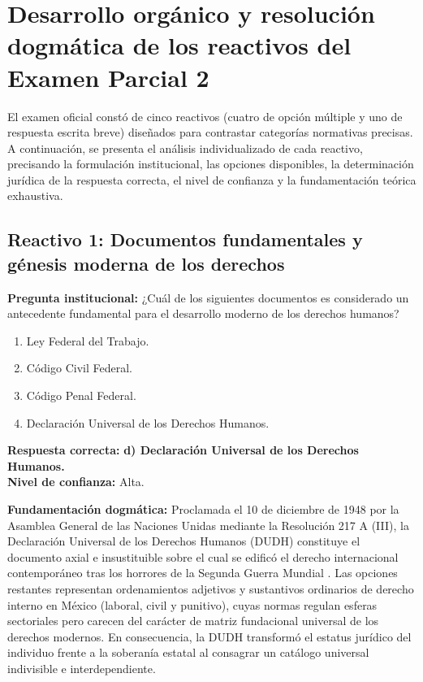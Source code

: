 \documentclass[12pt,spanish,letterpaper,oneside]{article}
\begin{document}
\section[Desarrollo org\'anico]{Desarrollo org\'anico y resoluci\'on dogm\'atica de los reactivos del Examen Parcial 2}

El examen oficial const\'o de cinco reactivos (cuatro de opci\'on m\'ultiple y uno de respuesta escrita breve) dise\~nados para contrastar categor\'ias normativas precisas. A continuaci\'on, se presenta el an\'alisis individualizado de cada reactivo, precisando la formulaci\'on institucional, las opciones disponibles, la determinaci\'on jur\'idica de la respuesta correcta, el nivel de confianza y la fundamentaci\'on te\'orica exhaustiva.

\subsection{Reactivo 1: Documentos fundamentales y g\'enesis moderna de los derechos}
\textbf{Pregunta institucional:} ¿Cu\'al de los siguientes documentos es considerado un antecedente fundamental para el desarrollo moderno de los derechos humanos?
\begin{enumerate}
\item[a)] Ley Federal del Trabajo.
\item[b)] C\'odigo Civil Federal.
\item[c)] C\'odigo Penal Federal.
\item[d)] Declaraci\'on Universal de los Derechos Humanos.
\end{enumerate}

\textbf{Respuesta correcta:} \textbf{d) Declaraci\'on Universal de los Derechos Humanos.} \\
\textbf{Nivel de confianza:} Alta.

\textbf{Fundamentaci\'on dogm\'atica:} Proclamada el 10 de diciembre de 1948 por la Asamblea General de las Naciones Unidas mediante la Resoluci\'on 217 A (III), la Declaraci\'on Universal de los Derechos Humanos (DUDH) constituye el documento axial e insustituible sobre el cual se edific\'o el derecho internacional contempor\'aneo tras los horrores de la Segunda Guerra Mundial \citep{onuDeclaracion1948ADH}. Las opciones restantes representan ordenamientos adjetivos y sustantivos ordinarios de derecho interno en M\'exico (laboral, civil y punitivo), cuyas normas regulan esferas sectoriales pero carecen del car\'acter de matriz fundacional universal de los derechos modernos. En consecuencia, la DUDH transform\'o el estatus jur\'idico del individuo frente a la soberan\'ia estatal al consagrar un cat\'alogo universal indivisible e interdependiente.
\end{document}
